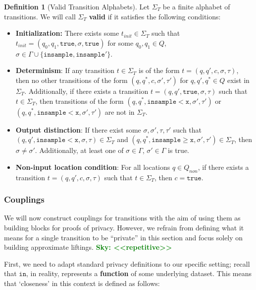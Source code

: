 \documentclass[12pt]{article}
\newcommand{\gguard}[1][x]{\texttt{insample}\geq#1}
\newcommand{\lguard}[1][x]{\texttt{insample} < #1}
\newcommand{\todo}[2]{\textcolor{#1}{\textbf{#2}}}
\newcommand{\sky}[1]{\todo{green}{Sky: <<#1>>}}
\theoremstyle{definition}
\newtheorem{defn}[thm]{Definition}
\begin{document}
\begin{defn}[Valid Transition Alphabets]
    Let $\Sigma_T$ be a finite alphabet of transitions. We will call $\Sigma_T$ \textbf{valid} if it satisfies the following conditions:
    \begin{itemize}
        \item \textbf{Initialization:} There exists some $t_{init}\in \Sigma_T$ such that $t_{init} = (q_0, q_1, \texttt{true}, \sigma, \texttt{true})$ for some $q_0, q_1\in Q$, $\sigma \in \Gamma\cup\{\texttt{insample}, \texttt{insample}'\}$. 
        \item \textbf{Determinism}: If any transition $t\in \Sigma_T$ is of the form $t=(q, q', c, \sigma, \tau)$, then no other transitions of the form $(q, q^*, c, \sigma', \tau')$ for $q, q', q^*\in Q$ exist in $\Sigma_T$. 
        Additionally, if there exists a transition $t=(q, q', \texttt{true}, \sigma, \tau)$ such that $t\in \Sigma_T$, then transitions of the form $(q, q^*, \lguard[\texttt{x}], \sigma', \tau')$ or $(q, q^*, \lguard[\texttt{x}], \sigma', \tau')$ are not in $\Sigma_T$. 
        \item \textbf{Output distinction}: If there exist some $\sigma, \sigma', \tau, \tau'$ such that $(q, q', \lguard[\texttt{x}], \sigma, \tau)\in \Sigma_T$  and $(q, q^*, \gguard[\texttt{x}], \sigma', \tau') \in \Sigma_T$, then $\sigma \neq \sigma'$. Additionally, at least one of $\sigma\in \Gamma$, $\sigma'\in \Gamma$ is true.
        \item \textbf{Non-input location condition}: For all locations $q\in Q_{non}$, if there exists a transition $t=(q, q', c, \sigma, \tau)$ such that $t\in \Sigma_T$, then $c = \texttt{true}$.
    \end{itemize}
\end{defn}

\subsubsection{Couplings}

We will now construct couplings for transitions with the aim of using them as building blocks for proofs of privacy. However, we refrain from defining what it means for a single transition to be ``private'' in this section and focus solely on building approximate liftings. \sky{repetitive}

First, we need to adapt standard privacy definitions to our specific setting; recall that $\texttt{in}$, in reality, represents a \textbf{function} of some underlying dataset. This means that `closeness' in this context is defined as follows:
\end{document}
